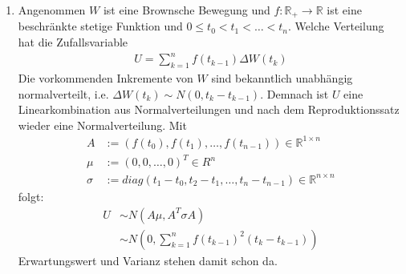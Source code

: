\documentclass[a4paper,11pt,notitlepage,fullpage]{article}
\newcommand{\R}{\mathbb R}
\begin{document}
\begin{enumerate}
\begin{enumerate}
\end{enumerate}

\newpage
\item Angenommen $W$ ist eine Brownsche Bewegung und $f: \R_+ \to \R$ ist eine beschränkte stetige Funktion und $0 \leq t_0 < t_1 < \ldots < t_n$. Welche Verteilung hat die Zufallsvariable
\begin{align*}
U = \sum_{k=1}^n f(t_{k-1})\Delta W(t_k)
\end{align*}
Die vorkommenden Inkremente von $W$ sind bekanntlich unabhängig normalverteilt, i.e. $\Delta W(t_k) \sim N(0, t_k - t_{k-1})$. Demnach ist $U$ eine Linearkombination aus Normalverteilungen und nach dem Reproduktionssatz wieder eine Normalverteilung. Mit
\begin{align*}
A &:= \left(f(t_0), f(t_1), \ldots, f(t_{n-1})\right) \in \R^{1\times n} \\
\mu &:= \left(0, 0, \ldots, 0\right)^T \in R^n \\
\sigma &:= diag\left(t_1 - t_0, t_2 - t_1, \ldots, t_n - t_{n-1}\right) \in \R^{n\times n}
\end{align*}
folgt:
\begin{align*}
U &\sim N\left(A\mu, A^T \sigma A\right) \\
&\sim N\left(0, \sum_{k=1}^n f(t_{k-1})^2(t_k - t_{k-1})\right)
\end{align*}
Erwartungswert und Varianz stehen damit schon da.


\end{enumerate}
\end{document}
